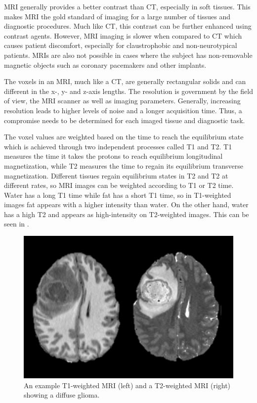 MRI generally provides a better contrast than CT, especially in soft tissues. This makes MRI the gold standard of imaging for a large number of tissues and diagnostic procedures. Much like CT, this contrast can be further enhanced using contrast agents. However, MRI imaging is slower when compared to CT which causes patient discomfort, especially for claustrophobic and non-neurotypical patients. MRIs are also not possible in cases where the subject has non-removable magnetic objects such as coronary pacemakers and other implants.

The voxels in an MRI, much like a CT, are generally rectangular solids and can different in the x-, y- and z-axis lengths. The resolution is government by the field of view, the MRI scanner as well as imaging parameters. Generally, increasing resolution leads to higher levels of noise and a longer acquisition time. Thus, a compromise needs to be determined for each imaged tissue and diagnostic task. 

The voxel values are weighted based on the time to reach the equilibrium state which is achieved through two independent processes called T1 and T2. T1 measures the time it takes the protons to reach equilibrium longitudinal magnetization, while T2 measures the time to regain its equilibrium transverse magnetization. Different tissues regain equilibrium states in T2 and T2 at different rates, so MRI images can be weighted according to T1 or T2 time. Water has a long T1 time while fat has a short T1 time, so in T1-weighted images fat appears with a higher intensity than water. On the other hand, water has a high T2 and appears as high-intensity on T2-weighted images. This can be seen in .

\begin{figure}[h]
 \centering
 \includegraphics[width=0.65\linewidth]{images/mri-t1-t2-example}
 \caption{An example T1-weighted MRI (left) and a T2-weighted MRI (right) showing a diffuse glioma. \cite{calabreseUniversityCaliforniaSan2022}}
 \label{fig:t1-t2-example}
 \end{figure}

